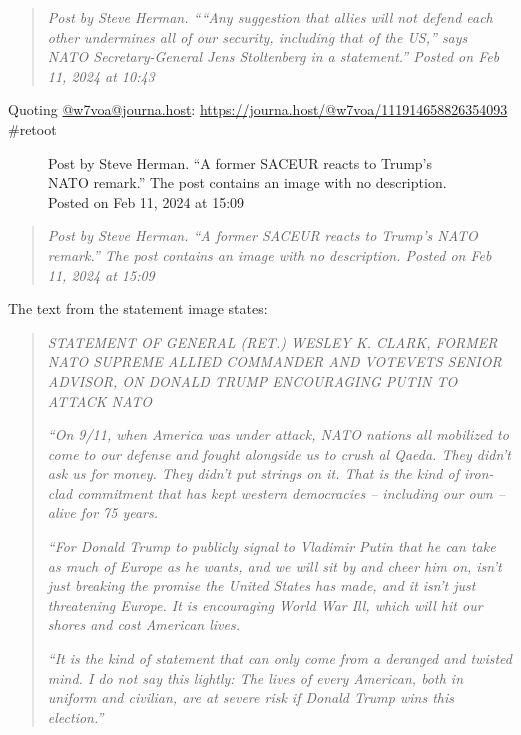 \begin{quote}
\emph{Post by Steve Herman. ````Any suggestion that allies will not
defend each other undermines all of our security, including that of the
US,'' says NATO Secretary-General Jens Stoltenberg in a statement.''
Posted on Feb 11, 2024 at 10:43}
\end{quote}

Quoting \href{https://journa.host/@w7voa/}{@w7voa@journa.host}:
\url{https://journa.host/@w7voa/111914658826354093} \#retoot

\begin{figure}
\centering
{}
\caption{Post by Steve Herman. ``A former SACEUR reacts to Trump's NATO
remark.'' The post contains an image with no description. Posted on Feb
11, 2024 at 15:09}
\end{figure}

\begin{quote}
\emph{Post by Steve Herman. ``A former SACEUR reacts to Trump's NATO
remark.'' The post contains an image with no description. Posted on Feb
11, 2024 at 15:09}
\end{quote}

The text from the statement image states:

\begin{quote}
\emph{STATEMENT OF GENERAL (RET.) WESLEY K. CLARK, FORMER NATO SUPREME
ALLIED COMMANDER AND VOTEVETS SENIOR ADVISOR, ON DONALD TRUMP
ENCOURAGING PUTIN TO ATTACK NATO}

\emph{``On 9/11, when America was under attack, NATO nations all
mobilized to come to our defense and fought alongside us to crush al
Qaeda. They didn't ask us for money. They didn't put strings on it. That
is the kind of iron-clad commitment that has kept western democracies --
including our own -- alive for 75 years.}

\emph{``For Donald Trump to publicly signal to Vladimir Putin that he
can take as much of Europe as he wants, and we will sit by and cheer him
on, isn't just breaking the promise the United States has made, and it
isn't just threatening Europe. It is encouraging World War Ill, which
will hit our shores and cost American lives.}

\emph{``It is the kind of statement that can only come from a deranged
and twisted mind. I do not say this lightly: The lives of every
American, both in uniform and civilian, are at severe risk if Donald
Trump wins this election.''}
\end{quote}

